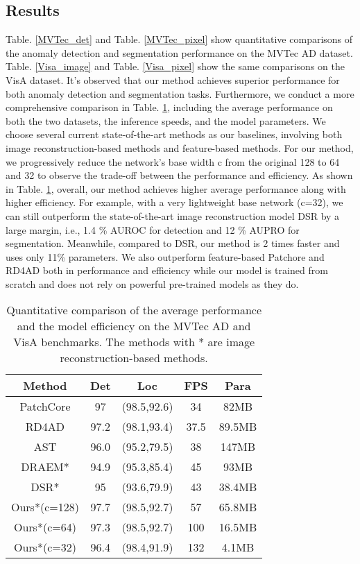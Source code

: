 \documentclass[5p, twocolumn]{elsarticle}[draft]
\begin{document}
\subsection{Results}
Table. \ref{MVTec_det} and Table. \ref{MVTec_pixel} show quantitative comparisons of the anomaly detection and segmentation performance on the MVTec AD dataset. Table. \ref{Visa_image} and Table. \ref{Visa_pixel} show the same comparisons on the VisA dataset. It's observed that our method achieves superior performance for both anomaly detection and segmentation tasks. Furthermore, we conduct a more comprehensive comparison in Table. \ref{OverallComparison}, including the average performance on both the two datasets, the inference speeds, and the model parameters. We choose several current state-of-the-art methods as our baselines, involving both image reconstruction-based methods and feature-based methods. For our method, we progressively reduce the network's base width c from the original 128 to 64 and 32 to observe the trade-off between the performance and efficiency. As shown in Table. \ref{OverallComparison}, overall, our method achieves higher average performance along with higher efficiency. For example, with a very lightweight base network (c=32), we can still outperform the state-of-the-art image reconstruction model DSR by a large margin, i.e., 1.4 \%  AUROC for detection and 12 \% AUPRO for segmentation. Meanwhile, compared to DSR, our method is 2 times faster and uses only 11\% parameters. We also outperform feature-based Patchore and RD4AD both in performance and efficiency while our model is trained from scratch and does not rely on powerful pre-trained models as they do. 

\begin{table}[htb]
\footnotesize
\caption{Quantitative comparison of the average performance and the model efficiency on the MVTec AD and VisA benchmarks. The methods with *  are image reconstruction-based methods.}
\label{OverallComparison}
\centering
\begin{tabular}{ccccc}
\hline
Method & Det & Loc & FPS & Para \\ \hline
PatchCore \cite{roth2022towards}& 97 & (98.5,92.6) & 34 & 82MB \\
RD4AD \cite{deng2022anomaly}& 97.2 & (98.1,93.4) & 37.5 & 89.5MB \\
AST \cite{rudolph2023asymmetric}& 96.0 & (95.2,79.5) & 38 & 147MB \\
DRAEM* \cite{zavrtanik2021draem}& 94.9 & (95.3,85.4) & 45 & 93MB \\
DSR* \cite{zavrtanik2022dsr}& 95 & (93.6,79.9) & 43 & 38.4MB \\
Ours*(c=128) & 97.7 & (98.5,92.7) & 57 & 65.8MB \\
Ours*(c=64) & 97.3 & (98.5,92.7) & 100 & 16.5MB \\
Ours*(c=32) & 96.4 & (98.4,91.9) & 132 & 4.1MB \\ \hline
\end{tabular}
\end{table}
\end{document}
